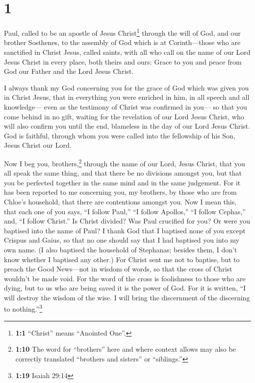 \hypertarget{section}{%
\section{1}\label{section}}

 Paul, called to be an apostle of Jesus Christ\footnote{\textbf{1:1}
  ``Christ'' means ``Anointed One''.} through the will of God, and our
brother Sosthenes,  to the assembly of God which is at
Corinth---those who are sanctified in Christ Jesus, called saints, with
all who call on the name of our Lord Jesus Christ in every place, both
theirs and ours:  Grace to you and peace from God our
Father and the Lord Jesus Christ.

 I always thank my God concerning you for the grace of God
which was given you in Christ Jesus,  that in everything
you were enriched in him, in all speech and all knowledge---
 even as the testimony of Christ was confirmed in you---
 so that you come behind in no gift, waiting for the
revelation of our Lord Jesus Christ,  who will also
confirm you until the end, blameless in the day of our Lord Jesus
Christ.  God is faithful, through whom you were called
into the fellowship of his Son, Jesus Christ our Lord.

 Now I beg you, brothers,\footnote{\textbf{1:10} The word
  for ``brothers'' here and where context allows may also be correctly
  translated ``brothers and sisters'' or ``siblings.''} through the name
of our Lord, Jesus Christ, that you all speak the same thing, and that
there be no divisions amongst you, but that you be perfected together in
the same mind and in the same judgement.  For it has been
reported to me concerning you, my brothers, by those who are from
Chloe's household, that there are contentions amongst you.
 Now I mean this, that each one of you says, ``I follow
Paul,'' ``I follow Apollos,'' ``I follow Cephas,'' and, ``I follow
Christ.''  Is Christ divided? Was Paul crucified for you?
Or were you baptised into the name of Paul?  I thank God
that I baptised none of you except Crispus and Gaius,  so
that no one should say that I had baptised you into my own name.
 (I also baptised the household of Stephanas; besides
them, I don't know whether I baptised any other.)  For
Christ sent me not to baptise, but to preach the Good News---not in
wisdom of words, so that the cross of Christ wouldn't be made void.
 For the word of the cross is foolishness to those who
are dying, but to us who are being saved it is the power of God.
 For it is written, ``I will destroy the wisdom of the
wise. I will bring the discernment of the discerning to
nothing.''\footnote{\textbf{1:19} Isaiah 29:14}


